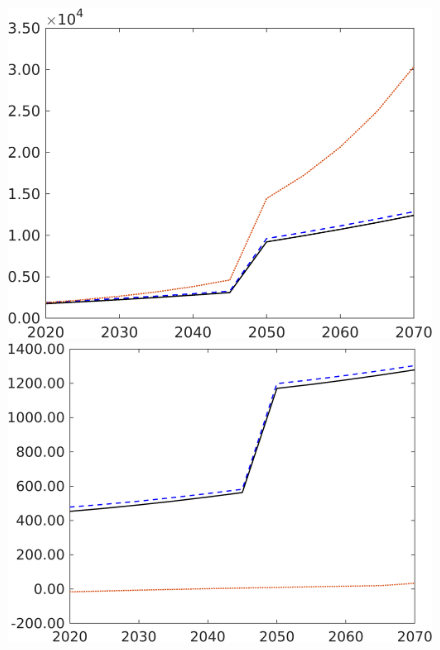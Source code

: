 \begin{figure}[h!!!]
\begin{minipage}[]{0.32\textwidth}
	\end{minipage}
	\begin{minipage}[]{0.32\textwidth}
		\includegraphics[width=1\textwidth]{../../codding_model/own_basedOnFried/optimalPol_190722_tidiedUp/figures/all_10Aout22/GFF_PercentageLfDynNT_Target_regime3_spillover0_noskill0_sep1_xgrowth0_PV1_etaa0.79_lgd0.png}
	\end{minipage}
	\begin{minipage}[]{0.32\textwidth}
		\includegraphics[width=1\textwidth]{../../codding_model/own_basedOnFried/optimalPol_190722_tidiedUp/figures/all_10Aout22/sgsff_PercentageLfDynNT_Target_regime3_spillover0_noskill0_sep1_xgrowth0_PV1_etaa0.79_lgd0.png}

\end{minipage}
\end{figure}
